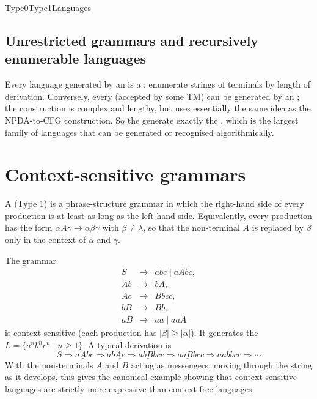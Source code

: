 \documentclass[hidelinks]{article}
\begin{document}
\begin{smodule}[title={Type 0 and Type 1 Languages and their Automata}]{Type0Type1Languages}
\subsection{Unrestricted grammars and recursively enumerable languages}

Every language generated by an  is a : enumerate strings of terminals by length of derivation. Conversely, every  (accepted by some TM) can be generated by an ; the construction is complex and lengthy, but uses essentially the same idea as the NPDA-to-CFG construction. So the  generate exactly the , which is the largest family of languages that can be generated or recognised algorithmically.

\section{Context-sensitive grammars}

\begin{sdefinition}[for=context-sensitive grammar]
A  (Type 1) is a phrase-structure grammar in which the right-hand side of every production is at least as long as the left-hand side. Equivalently, every production has the form $\alpha A \gamma \to \alpha \beta \gamma$ with $\beta \neq \lambda$, so that the non-terminal $A$ is replaced by $\beta$ only in the context of $\alpha$ and $\gamma$.
\end{sdefinition}

\begin{example}
The grammar
\[
\begin{array}{rcl}
S &\to& abc \mid aAbc,\\
Ab &\to& bA,\\
Ac &\to& Bbcc,\\
bB &\to& Bb,\\
aB &\to& aa \mid aaA
\end{array}
\]
is context-sensitive (each production has $|\beta| \geq |\alpha|$). It generates the  $L = \{a^n b^n c^n \mid n \geq 1\}$. A typical derivation is
\[
S \Rightarrow a\underline{A}bc \Rightarrow ab\underline{Ac} \Rightarrow a\underline{bB}bcc \Rightarrow a\underline{aB}bcc \Rightarrow aabbcc \Rightarrow \cdots
\]
With the non-terminals $A$ and $B$ acting as messengers, moving through the string as it develops, this gives the canonical example showing that context-sensitive languages are strictly more expressive than context-free languages.
\end{example}


\end{smodule}
\end{document}
